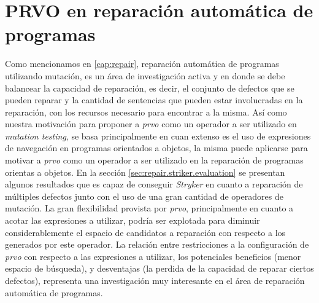 \section{PRVO en reparaci\'on autom\'atica de programas}

Como mencionamos en \ref{cap:repair}, reparaci\'on autom\'atica de programas utilizando mutaci\'on, es un \'area de investigaci\'on activa y en donde se debe balancear la capacidad de reparaci\'on, es decir, el conjunto de defectos que se pueden reparar y la cantidad de sentencias que pueden estar involucradas en la reparaci\'on, con los recursos necesario para encontrar a la misma. As\'i como nuestra motivaci\'on para proponer a \emph{prvo} como un operador a ser utilizado en \emph{mutation testing}, se basa principalmente en cuan extenso es el uso de expresiones de navegaci\'on en programas orientados a objetos, la misma puede aplicarse para motivar a \emph{prvo} como un operador a ser utilizado en la reparaci\'on de programas orientas a objetos. En la secci\'on \ref{sec:repair.striker.evaluation} se presentan algunos resultados que es capaz de conseguir \emph{Stryker} en cuanto a reparaci\'on de m\'ultiples defectos junto con el uso de una gran cantidad de operadores de mutaci\'on. La gran flexibilidad provista por \emph{prvo}, principalmente en cuanto a acotar las expresiones a utilizar, podr\'ia ser explotada para diminuir considerablemente el espacio de candidatos a reparaci\'on con respecto a los generados por este operador. La relaci\'on entre restricciones a la configuraci\'on de \emph{prvo} con respecto a las expresiones a utilizar, los potenciales beneficios (menor espacio de b\'usqueda), y desventajas (la perdida de la capacidad de reparar ciertos defectos), representa una investigaci\'on muy interesante en el \'area de reparaci\'on autom\'atica de programas.


